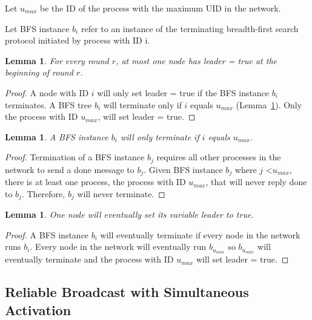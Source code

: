 \documentclass[english]{article}
\newtheorem{lemma}[theorem]{Lemma}
\begin{document}
\begin{definition}
Let $u_{max}$ be the ID of the process with the maximum UID in the network. 
\end{definition}

\begin{definition}
Let BFS instance $b_i$ refer to an instance of the terminating breadth-first search protocol initiated by process with ID i.
\end{definition}

\begin{lemma}
\label{LESafetyStatic}
For every round $r$, at most one node has leader = true at the beginning of round $r$.
\end{lemma}
\begin{proof}

A node with ID $i$ will only set leader = true if the BFS instance $b_i$ terminates.
A BFS tree $b_i$ will terminate only if $i$ equals $u_{max}$ (Lemma~\ref{BFSTermination}).
Only the process with ID $u_{max}$, will set leader = true. 

\end{proof}

\begin{lemma}
\label{BFSTermination}
  A BFS instance $b_i$ will only terminate if $i$ equals $u_{max}$.
\end{lemma}

\begin{proof}
Termination of a BFS instance $b_j$ requires all other processes in the network to send a done message to $b_j$.
Given BFS instance $b_j$ where $j$ \textless $u_{max}$, there is at least one process, the process with ID $u_{max}$, that will never reply done to $b_j$.
Therefore, $b_j$ will never terminate.
\end{proof}

\begin{lemma}
\label{LELivenessStatic}
  One node will eventually set its variable leader to true.
\end{lemma}
\begin{proof}
A BFS instance $b_i$ will eventually terminate if every node in the network runs $b_i$. 
Every node in the network will eventually run $b_{u_{max}}$ so $b_{u_{max}}$ will eventually terminate and the process with ID $u_{max}$ will set leader = true.
\end{proof}




\subsection {Reliable Broadcast with Simultaneous Activation}
\end{document}
